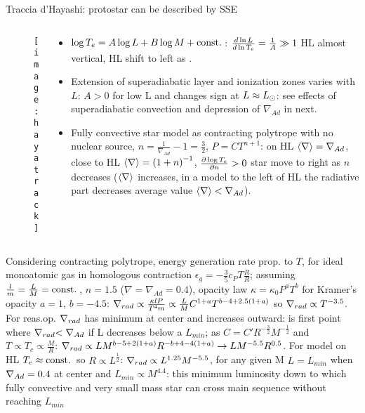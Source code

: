 \begin{frame}{Traccia d'Hayashi: protostar can be described by SSE}
	\begin{columns}[T]
		\begin{column}{0.50\textwidth}
            \begin{figure}[!ht]\texttt{[image: hayatrack]}
			\end{figure}
		\end{column}
		\begin{column}{0.50\textwidth}
            \begin{itemize}
                    \item $\log{T_e}=A\log{L}+B\log{M}+\const{}$: $\TDly{T_e}{L}=\frac{1}{A}\gg1$ HL almost vertical, HL shift to left as .
                    \item Extension of superadiabatic layer and ionization zones varies with $L$: $A>0$ for low L and changes sign at $L\approx\lsun$: see effects of superadiabatic convection and depression of $\nabla_{Ad}$ in next.
                    \item Fully convective star model as contracting polytrope with no nuclear source, $n=\frac{1}{\nabla_{Ad}}-1=\frac{3}{2}$, $P=CT^{n+1}$: on HL $\exv{\nabla}=\nabla_{Ad}$, close to HL $\exv{\nabla}=\invers{(1+n)}$, $\PDy{n}{\log{T_e}}>0$ star move to right as $n$ decreases ($\exv{\nabla}$ increases, in a model to the left of HL the radiative part decreases average value $\exv{\nabla}<\nabla_{Ad}$).
                \end{itemize}
		\end{column}
	\end{columns}
    Considering contracting polytrope, energy generation rate prop. to $T$, for ideal monoatomic gas in homologous contraction $\epsilon_g=-\frac{3}{5}c_PT \frac{\dot{R}}{R}$; assuming $\frac{l}{m}=\frac{L}{M}=\const{}$, $n=1.5$ ($\nabla=\nabla_{Ad}=0.4$), opacity law $\kappa=\kappa_0P^aT^b$ for Kramer's opacity $a=1$, $b=-4.5$: $\nrad\propto\frac{\kappa l P}{T^4m}\propto\frac{L}{M}C^{1+a}T^{b-4+2.5(1+a)}$ so $\nrad{}\propto T^{-3.5}$. For reas.op. $\nrad{}$ has minimum at center and increases outward: is first point where $\nrad{<\nad{}}$ if L decreases below a $L_{min}$; as $C=C'R^{-\frac{3}{2}}M^{-\frac{1}{2}}$ and $T\propto T_c\propto \frac{M}{R}$: $\nrad{}\propto LM^{b-5+2(1+a)}R^{-b+4-4(1+a)}\to LM^{-5.5}R^{0.5}$. For model on HL $T_e\approx\const{}$ so $R\propto L^{\frac{1}{2}}$: $\nrad{}\propto L^{1.25}M^{-5.5}$, for any given M $L=L_{min}$ when $\nad{}=0.4$ at center and $L_{min}\propto M^{4.4}$: this minimum luminosity down to which fully convective and very small mass star can cross main sequence without reaching $L_{min}$
\end{frame}


